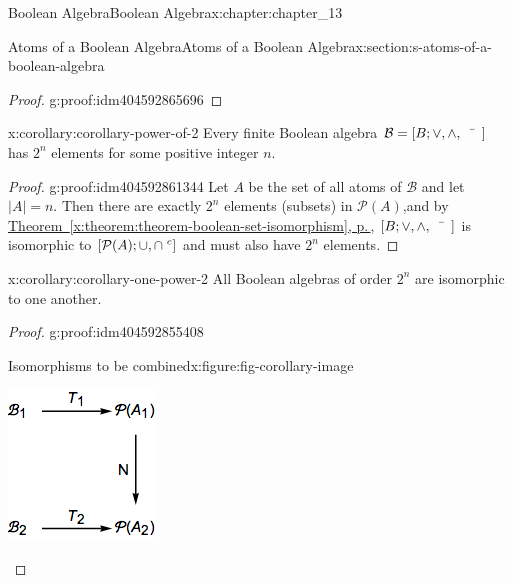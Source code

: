 \documentclass[twoside,10pt,]{book}
\newcommand{\xreffont}{\relax}
\numberwithin{equation}{section}
\begin{document}
\begin{chapterptx}{Boolean Algebra}{}{Boolean Algebra}{}{}{x:chapter:chapter_13}
\begin{sectionptx}{Atoms of a Boolean Algebra}{}{Atoms of a Boolean Algebra}{}{}{x:section:s-atoms-of-a-boolean-algebra}
\begin{proof}{}{g:proof:idm404592865696}
\end{proof}
\begin{corollary}{}{}{x:corollary:corollary-power-of-2}%
Every finite Boolean algebra \(\mathcal{B}=[B; \lor, \land, \bar{\hspace{5 mm}}]\) has \(2^n\)  elements for some positive integer \(n\).%
\end{corollary}
\begin{proof}{}{g:proof:idm404592861344}
Let \(A\) be the set of all atoms of \(\mathcal{B}\) and let \(\left| A\right|  = n\). Then there are exactly \(2^n\) elements (subsets) in \(\mathcal{P}(A)\),and by \hyperref[x:theorem:theorem-boolean-set-isomorphism]{Theorem~{\xreffont\ref{x:theorem:theorem-boolean-set-isomorphism}}, p.\,\pageref{x:theorem:theorem-boolean-set-isomorphism}}, \([B; \lor, \land, \bar{\hspace{5 mm}} ]\) is isomorphic to \([\mathcal{P}(A); \cup , \cap \hspace{1 mm}^c]\) and must also have \(2^n\) elements.%
\end{proof}
\begin{corollary}{}{}{x:corollary:corollary-one-power-2}%
All Boolean algebras of order \(2^n\) are isomorphic to one another.%
\end{corollary}
\begin{proof}{}{g:proof:idm404592855408}
\begin{figureptx}{Isomorphisms to be combined}{x:figure:fig-corollary-image}{}%
\begin{image}{0.325}{0.35}{0.325}%
\includegraphics[width=\linewidth]{images/fig-corollary-image.png}

\end{image}
\end{figureptx}
\end{proof}
\end{sectionptx}
\end{chapterptx}
\end{document}
